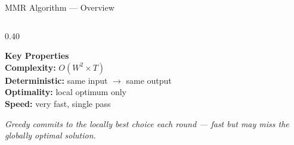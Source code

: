 \documentclass[aspectratio=169]{beamer}
\begin{document}
\begin{frame}{MMR Algorithm --- Overview}
\begin{columns}[T]
    \begin{column}{0.40\textwidth}
      \colorbox{offwhite}{\begin{minipage}{\linewidth}
        \vspace{6pt}
        {\small\bfseries\color{teal} Key Properties}\\[6pt]
        {\small\color{navy}\bfseries Complexity:\;}
          {\small $O(W^2 \times T)$}\\[5pt]
        {\small\color{navy}\bfseries Deterministic:\;}
          {\small same input $\to$ same output}\\[5pt]
        {\small\color{navy}\bfseries Optimality:\;}
          {\small local optimum only}\\[5pt]
        {\small\color{navy}\bfseries Speed:\;}
          {\small very fast, single pass}
        \vspace{6pt}
      \end{minipage}}

      \vspace{10pt}
      \colorbox{navymid}{\begin{minipage}{\linewidth}
        \vspace{5pt}
        {\color{teallt}\small\itshape
         Greedy commits to the locally best choice each round ---
         fast but may miss the globally optimal solution.}
        \vspace{5pt}
      \end{minipage}}
    \end{column}
  \end{columns}
\end{frame}

\end{document}
